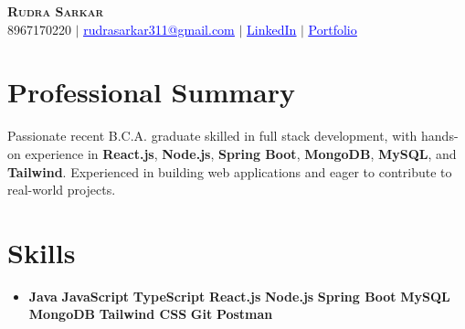 \documentclass[letterpaper,11pt]{article}
\newcommand{\resumeSubHeadingListStart}{\begin{itemize}[leftmargin=0.10in, label={}]}
\begin{document}

\begin{center}
    \textbf{\Huge \scshape Rudra Sarkar} \\ \vspace{5pt}
    \small 8967170220 $|$ \href{mailto:rudrasarkar311@gmail.com}{\textcolor{blue}{\underline{rudrasarkar311@gmail.com}}} $|$
    \href{https://www.linkedin.com/in/rudra-sarkar-853385225}{\textcolor{blue}{\underline{LinkedIn}}} $|$
    \href{https://rudrasarkar5.github.io/my-portfolio/}{\textcolor{blue}{\underline{Portfolio}}} 
   

\end{center}


\section*{Professional Summary}
Passionate recent B.C.A. graduate skilled in full stack development, with hands-on experience in \textbf{React.js}, \textbf{Node.js}, \textbf{Spring Boot}, \textbf{MongoDB}, \textbf{MySQL}, and \textbf{Tailwind}. Experienced in building web applications and eager to contribute to real-world projects.


\section{Skills}
\begin{itemize}
    \item \textbf{Java} \textbullet{} \textbf{JavaScript} \textbullet{} \textbf{TypeScript} \textbullet{} \textbf{React.js} \textbullet{} \textbf{Node.js} \textbullet{} \textbf{Spring Boot} \textbullet{} \textbf{MySQL} \textbullet{} \textbf{MongoDB} \textbullet{} \textbf{Tailwind CSS} \textbullet{} \textbf{Git} \textbullet{} \textbf{Postman}
\end{itemize}



\end{document}
